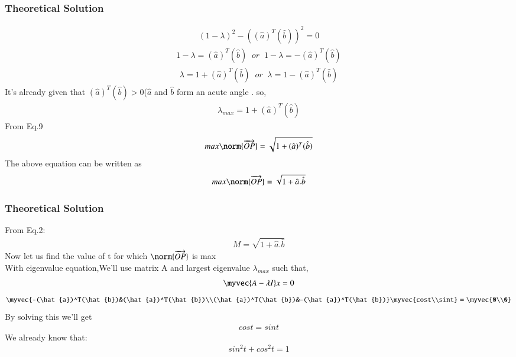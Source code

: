 \documentclass{beamer}
\begin{document}
\begin{frame}
\frametitle{Theoretical Solution}
    \begin{align}
    (1-\lambda)^2-((\hat{a})^T(\hat{b}))^2=0
\end{align}
\begin{align}
    1-\lambda=(\hat{a})^T(\hat{b})\;\;or\;\;1-\lambda=-(\hat{a})^T(\hat{b})
\end{align}
\begin{align}
    \lambda=1+(\hat{a})^T(\hat{b})\;\;or \;\;\lambda=1-(\hat{a})^T(\hat{b})
\end{align}
It's already given that $(\hat{a})^T(\hat{b})>0 $($\hat{a}$ and $\hat{b}$ form an acute angle . so,
\begin{align}
 \lambda_{max}=1+  (\hat{a})^T(\hat{b}) 
\end{align}
From Eq.9
\begin{align}
    max\norm{\overrightarrow{OP}}=\sqrt{1+  (\hat{a})^T(\hat{b}) }
\end{align}
The above equation can be written as
\begin{align}
   max \norm{\overrightarrow{OP}}=\sqrt{1+\hat{a}.\hat{b}}
\end{align}

\end{frame}
\begin{frame}
\frametitle{Theoretical Solution}
   From Eq.2:
\begin{align}
    M=\sqrt{1+\hat{a}.\hat{b}}
\end{align}
Now let us find the value of t for which $\norm{\overrightarrow{OP}}$ is max\\
With eigenvalue equation,We'll use matrix A and largest eigenvalue $\lambda_{max}$ such that,
\begin{align}
    \myvec{A-\lambda I}x=0
\end{align}
\begin{align}
    \myvec{-(\hat{a})^T(\hat{b})&(\hat{a})^T(\hat{b})\\(\hat{a})^T(\hat{b})&-(\hat{a})^T(\hat{b})}\myvec{cost\\sint}=\myvec{0\\0}
\end{align}
By solving this we'll get 
\begin{align}
    cost=sint
\end{align}
We already know that:
\begin{align}
    sin^2t+cos^2t=1
\end{align}

\end{frame}
\end{document}
